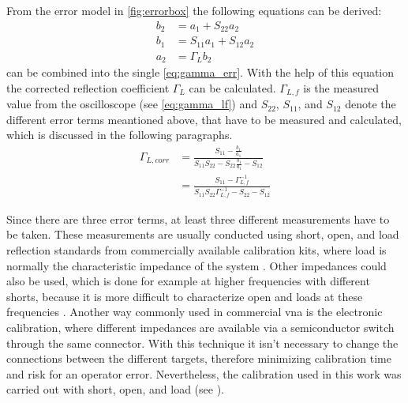 \documentclass[12pt,a4paper,parskip=full,abstract=true,BCOR=10mm,twoside,open=right]{scrreprt}
\begin{document}
From the error model in \cref{fig:errorbox} the following equations can be derived:
\begin{align}
    \label{eq:b2} b_{2} & = a_{1} + S_{22} a_{2}\\
    \label{eq:b1} b_{1} & = S_{11} a_{1} + S_{12} a_{2} \\
    \label{eq:a2} a_{2} & = \Gamma_L b_{2}
\end{align}
 can be combined into the single \cref{eq:gamma_err}.
With the help of this equation the corrected reflection coefficient $\Gamma_L$ can be calculated.
$\Gamma_{L,f}$ is the measured value from the oscilloscope (see \cref{eq:gamma_lf}) and $S_{22}$, $S_{11}$, and $S_{12}$ denote the different
error terms meantioned above, that have to be measured and calculated, which is discussed in the following paragraphs.
\begin{equation}\label{eq:gamma_err}
    \begin{split}
        \Gamma_{L,corr} & = \frac{S_{11} - \frac{b_1}{a_1}}{S_{11} S_{22} - S_{22}\frac{b_1}{a_1} - S_{12}} \\
                        & = \frac{S_{11} - \Gamma_{L,f}^{-1}}{S_{11} S_{22}\Gamma_{L,f}^{-1} - S_{22} - S_{12}}
    \end{split}
\end{equation}

Since there are three error terms, at least three different measurements have
to be taken. These measurements are usually conducted using short, open, and load reflection standards from commercially available calibration kits,
where load is normally the characteristic impedance of the system \cite{agilent_an_1287-3}.
Other impedances could also be used, which is done for example at higher frequencies
with different shorts, because it is more difficult to characterize open and
loads at these frequencies \cite{anritsu_cal}. Another way commonly used in
commercial \gls{vna} is the electronic calibration, where different impedances
are available via a semiconductor switch through the same connector. With this
technique it isn't necessary to change the connections between the different
targets, therefore minimizing calibration time and risk for an operator error.
Nevertheless, the calibration used in this work was carried out with short, open, and load (see
).
\end{document}
